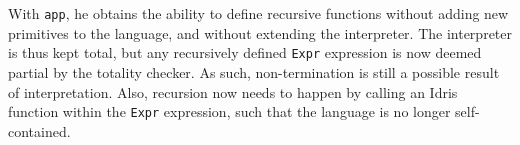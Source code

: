With \texttt{app}, he obtains the ability to define recursive functions without adding new primitives to the language, and without extending the interpreter. The interpreter is thus kept total, but any recursively defined \texttt{Expr} expression is now deemed partial by the totality checker. As such, non-termination is still a possible result of interpretation. Also, recursion now needs to happen by calling an Idris function within the \texttt{Expr} expression, such that the language is no longer self-contained.